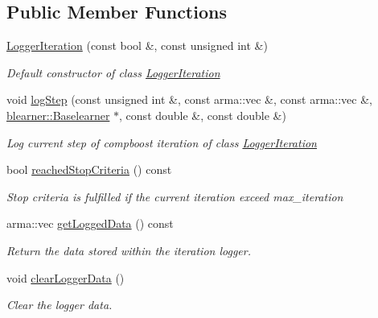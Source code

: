 \subsection*{Public Member Functions}
\begin{DoxyCompactItemize}
\item 
\mbox{\hyperlink{classlogger_1_1_logger_iteration_a79ab91e7e508f56cbfac3d670a79987c}{Logger\+Iteration}} (const bool \&, const unsigned int \&)
\begin{DoxyCompactList}\small\item\em Default constructor of class {\ttfamily \mbox{\hyperlink{classlogger_1_1_logger_iteration}{Logger\+Iteration}}} \end{DoxyCompactList}\item 
void \mbox{\hyperlink{classlogger_1_1_logger_iteration_a155e7fd8c8130211f54804c5ff3a054b}{log\+Step}} (const unsigned int \&, const arma\+::vec \&, const arma\+::vec \&, \mbox{\hyperlink{classblearner_1_1_baselearner}{blearner\+::\+Baselearner}} $\ast$, const double \&, const double \&)
\begin{DoxyCompactList}\small\item\em Log current step of compboost iteration of class {\ttfamily \mbox{\hyperlink{classlogger_1_1_logger_iteration}{Logger\+Iteration}}} \end{DoxyCompactList}\item 
bool \mbox{\hyperlink{classlogger_1_1_logger_iteration_af4cd1f0b87dcff8a88439f2ca6b07f1f}{reached\+Stop\+Criteria}} () const
\begin{DoxyCompactList}\small\item\em Stop criteria is fulfilled if the current iteration exceed {\ttfamily max\+\_\+iteration} \end{DoxyCompactList}\item 
arma\+::vec \mbox{\hyperlink{classlogger_1_1_logger_iteration_a2d0404feb799850420874612a435f3da}{get\+Logged\+Data}} () const
\begin{DoxyCompactList}\small\item\em Return the data stored within the iteration logger. \end{DoxyCompactList}\item 
void \mbox{\hyperlink{classlogger_1_1_logger_iteration_ac7c2aace3ba5f22d8f42ec078fe62602}{clear\+Logger\+Data}} ()
\begin{DoxyCompactList}\small\item\em Clear the logger data. \end{DoxyCompactList}\item 

\end{DoxyCompactItemize}
